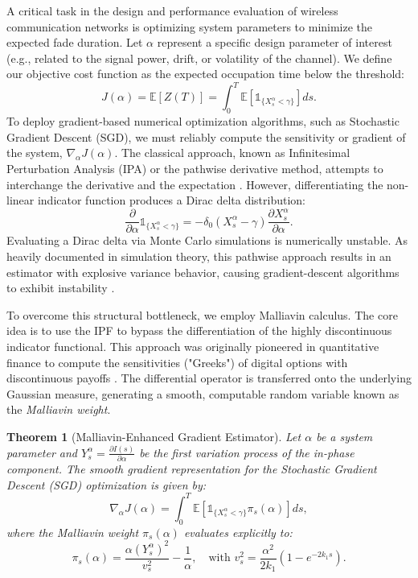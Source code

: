 \documentclass[11pt]{article}
\newtheorem{theorem}{Theorem}
\begin{document}
A critical task in the design and performance evaluation of wireless communication networks is optimizing system parameters to minimize the expected fade duration. Let $\alpha$ represent a specific design parameter of interest (e.g., related to the signal power, drift, or volatility of the channel). We define our objective cost function as the expected occupation time below the threshold:
\begin{equation}
    J(\alpha) = \mathbb{E}[Z(T)] = \int_0^T \mathbb{E}\left[\mathds{1}_{\{X_s^\alpha < \gamma\}}\right] ds.
\end{equation}
To deploy gradient-based numerical optimization algorithms, such as Stochastic Gradient Descent (SGD), we must reliably compute the sensitivity or gradient of the system, $\nabla_\alpha J(\alpha)$. The classical approach, known as Infinitesimal Perturbation Analysis (IPA) or the pathwise derivative method, attempts to interchange the derivative and the expectation \citet{glasserman2004monte}. However, differentiating the non-linear indicator function produces a Dirac delta distribution:
\begin{equation}
    \frac{\partial}{\partial \alpha} \mathds{1}_{\{X_s^\alpha < \gamma\}} = -\delta_0(X_s^\alpha - \gamma) \frac{\partial X_s^\alpha}{\partial \alpha}.
\end{equation}
Evaluating a Dirac delta via Monte Carlo simulations is numerically unstable. As heavily documented in simulation theory, this pathwise approach results in an estimator with explosive variance behavior, causing gradient-descent algorithms to exhibit instability \citet{asmussen2007stochastic}. 

To overcome this structural bottleneck, we employ Malliavin calculus. The core idea is to use the IPF to bypass the differentiation of the highly discontinuous indicator functional. This approach was originally pioneered in quantitative finance to compute the sensitivities ("Greeks") of digital options with discontinuous payoffs \citet{fournie1999applications}. The differential operator is transferred onto the underlying Gaussian measure, generating a smooth, computable random variable known as the \textit{Malliavin weight}.

\begin{theorem}[Malliavin-Enhanced Gradient Estimator] \label{thm:optimal_weights}
Let $\alpha$ be a system parameter and $Y_s^\alpha = \frac{\partial I(s)}{\partial \alpha}$ be the first variation process of the in-phase component. The smooth gradient representation for the Stochastic Gradient Descent (SGD) optimization is given by:
\begin{equation}
    \nabla_\alpha J(\alpha) = \int_0^T \mathbb{E} \left[ \mathds{1}_{\{X_s^\alpha < \gamma\}} \pi_s(\alpha) \right] ds,
\end{equation}
where the Malliavin weight $\pi_s(\alpha)$ evaluates explicitly to:
\begin{equation}
    \pi_s(\alpha) = \frac{\alpha (Y_s^\alpha)^2}{v_s^2} - \frac{1}{\alpha}, \quad \text{with } v_s^2 = \frac{\alpha^2}{2k_1}(1 - e^{-2k_1 s}).
\end{equation}
\end{theorem}
\end{document}
